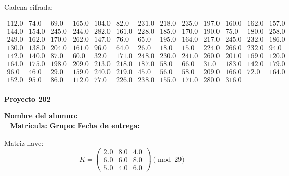 \documentclass[12pt]{article}
\begin{document}
Cadena cifrada:
\begin{center}
$\begin{array}{lllllllllllll}
112.0 & 74.0 & 69.0 & 165.0 & 104.0 & 82.0 & 231.0 & 218.0 & 235.0 & 197.0 & 160.0 & 162.0 & 157.0\\
144.0 & 154.0 & 245.0 & 244.0 & 282.0 & 161.0 & 228.0 & 185.0 & 170.0 & 190.0 & 75.0 & 180.0 & 258.0\\
249.0 & 162.0 & 170.0 & 262.0 & 147.0 & 76.0 & 65.0 & 195.0 & 164.0 & 217.0 & 245.0 & 232.0 & 186.0\\
130.0 & 138.0 & 204.0 & 161.0 & 96.0 & 64.0 & 26.0 & 18.0 & 15.0 & 224.0 & 266.0 & 232.0 & 94.0\\
142.0 & 140.0 & 87.0 & 60.0 & 32.0 & 171.0 & 248.0 & 230.0 & 241.0 & 260.0 & 201.0 & 169.0 & 120.0\\
164.0 & 175.0 & 198.0 & 209.0 & 213.0 & 218.0 & 187.0 & 58.0 & 66.0 & 31.0 & 183.0 & 142.0 & 179.0\\
96.0 & 46.0 & 29.0 & 159.0 & 240.0 & 219.0 & 45.0 & 56.0 & 58.0 & 209.0 & 166.0 & 72.0 & 164.0\\
152.0 & 95.0 & 86.0 & 112.0 & 77.0 & 226.0 & 238.0 & 155.0 & 171.0 & 280.0 & 316.0\\
\end{array}$
\end{center}

\newpage


\textbf{Proyecto 202}

\textbf{Nombre del alumno:} \underline{\hspace{13cm}}\\\
\vspace{1cm}
\textbf{Matrícula:} \underline{\hspace{4cm}} \hspace{1cm}
\textbf{Grupo:} \underline{\hspace{2cm}}
\textbf{Fecha de entrega:} \underline{\hspace{2cm}}

\medskip

Matriz llave:
\[
K = \begin{pmatrix}
2.0 & 8.0 & 4.0\\
6.0 & 6.0 & 8.0\\
5.0 & 4.0 & 6.0
\end{pmatrix} \pmod{29}
\]
\end{document}
